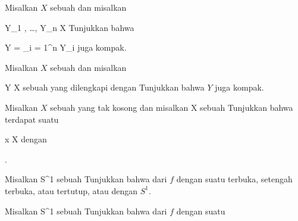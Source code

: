 {}
{

Misalkan $X$ sebuah
dan misalkan

\mavergleichskette
{\vergleichskette
{Y_1 , \ldots , Y_n
}
{ \subseteq }{ X
}
{  }{
}
{    }{
}
{   }{
}
}
{}{}{}
Tunjukkan bahwa

\mavergleichskette
{\vergleichskette
{ Y
}
{ = }{ \bigcup_{i = 1}^n Y_i
}
{  }{
}
{    }{
}
{   }{
}
}
{}{}{}
juga kompak.

}
{} {}

{}
{

Misalkan $X$ sebuah
dan misalkan

\mavergleichskette
{\vergleichskette
{Y
}
{ \subseteq }{ X
}
{  }{
}
{    }{
}
{   }{
}
}
{}{}{}
sebuah
yang dilengkapi dengan
Tunjukkan bahwa $Y$ juga kompak.

}
{} {}

{}
{

Misalkan $X$ sebuah
yang tak kosong dan misalkan
 { X } {\R
} {}
sebuah
Tunjukkan bahwa terdapat suatu

\mavergleichskette
{\vergleichskette
{ x
}
{ \in }{ X
}
{  }{
}
{    }{
}
{   }{
}
}
{}{}{}
dengan

 {  }
.

}
{} {}

{}
{

Misalkan
 {\R} {S^1
} {}
sebuah
Tunjukkan bahwa
dari $f$
dengan suatu
terbuka, setengah terbuka, atau tertutup, atau dengan $S^1$.

}
{} {}

{}
{

Misalkan
 {S^1} {\R
} {}
sebuah
Tunjukkan bahwa
dari $f$
dengan suatu

}
{} {}

